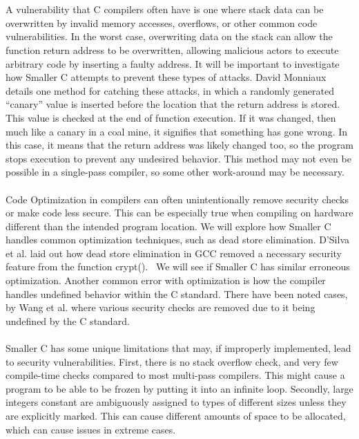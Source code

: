 \documentclass[sigconf, anonymous]{acmart}
\begin{document}
\\\\
A vulnerability that C compilers often have is one where stack data can be overwritten by invalid memory accesses, overflows, or other common code vulnerabilities. In the worst case, overwriting data on the stack can allow the function return address to be overwritten, allowing malicious actors to execute arbitrary code by inserting a faulty address. It will be important to investigate how Smaller C attempts to prevent these types of attacks. David Monniaux details one method for catching these attacks, in which a randomly generated “canary” value is inserted before the location that the return address is stored.~\cite{Monniaux:Memory} This value is checked at the end of function execution. If it was changed, then much like a canary in a coal mine, it signifies that something has gone wrong. In this case, it means that the return address was likely changed too, so the program stops execution to prevent any undesired behavior. This method may not even be possible in a single-pass compiler, so some other work-around may be necessary.
\\\\
Code Optimization in compilers can often unintentionally remove security checks or make code less secure. This can be especially true when compiling on hardware different than the intended program location. We will explore how Smaller C handles common optimization techniques, such as dead store elimination. D’Silva et al. laid out how dead store elimination in GCC removed a necessary security feature from the function crypt().~\cite{DSilva:Correctness} We will see if Smaller C has similar erroneous optimization. Another common error with optimization is how the compiler handles undefined behavior within the C standard. There have been noted cases, by Wang et al. where various security checks are removed due to it being undefined by the C standard.~\cite{Wang:Optimization}
\\\\
Smaller C has some unique limitations that may, if improperly implemented, lead to security vulnerabilities. First, there is no stack overflow check, and very few compile-time checks compared to most multi-pass compilers. This might cause a program to be able to be frozen by putting it into an infinite loop. Secondly, large integers constant are ambiguously assigned to types of different sizes unless they are explicitly marked. This can cause different amounts of space to be allocated, which can cause issues in extreme cases.
\end{document}
